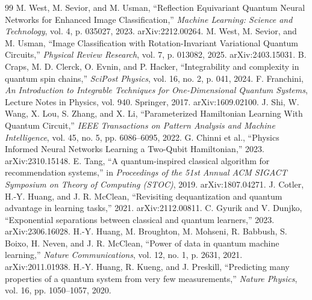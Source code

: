 \documentclass[11pt]{article}
\begin{document}
\begin{thebibliography}{99}
 M. West, M. Sevior, and M. Usman, ``Reflection Equivariant Quantum Neural Networks for Enhanced Image Classification,'' \textit{Machine Learning: Science and Technology}, vol. 4, p. 035027, 2023. arXiv:2212.00264.
 M. West, M. Sevior, and M. Usman, ``Image Classification with Rotation-Invariant Variational Quantum Circuits,'' \textit{Physical Review Research}, vol. 7, p. 013082, 2025. arXiv:2403.15031.
 B. Craps, M. D. Clerck, O. Evnin, and P. Hacker, ``Integrability and complexity in quantum spin chains,'' \textit{SciPost Physics}, vol. 16, no. 2, p. 041, 2024.
 F. Franchini, \textit{An Introduction to Integrable Techniques for One-Dimensional Quantum Systems}, Lecture Notes in Physics, vol. 940. Springer, 2017. arXiv:1609.02100.
 J. Shi, W. Wang, X. Lou, S. Zhang, and X. Li, ``Parameterized Hamiltonian Learning With Quantum Circuit,'' \textit{IEEE Transactions on Pattern Analysis and Machine Intelligence}, vol. 45, no. 5, pp. 6086--6095, 2022.
 G. Chinni et al., ``Physics Informed Neural Networks Learning a Two-Qubit Hamiltonian,'' 2023. arXiv:2310.15148.
 E. Tang, ``A quantum-inspired classical algorithm for recommendation systems,'' in \textit{Proceedings of the 51st Annual ACM SIGACT Symposium on Theory of Computing (STOC)}, 2019. arXiv:1807.04271.
 J. Cotler, H.-Y. Huang, and J. R. McClean, ``Revisiting dequantization and quantum advantage in learning tasks,'' 2021. arXiv:2112.00811.
 C. Gyurik and V. Dunjko, ``Exponential separations between classical and quantum learners,'' 2023. arXiv:2306.16028.
 H.-Y. Huang, M. Broughton, M. Mohseni, R. Babbush, S. Boixo, H. Neven, and J. R. McClean, ``Power of data in quantum machine learning,'' \textit{Nature Communications}, vol. 12, no. 1, p. 2631, 2021. arXiv:2011.01938.
 H.-Y. Huang, R. Kueng, and J. Preskill, ``Predicting many properties of a quantum system from very few measurements,'' \textit{Nature Physics}, vol. 16, pp. 1050--1057, 2020.

\end{thebibliography}
\end{document}
